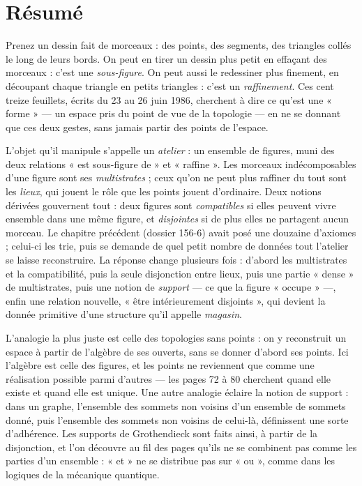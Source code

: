 \documentclass[11pt,a4paper]{article}
\begin{document}
\section*{Résumé}

\begin{resume}
Prenez un dessin fait de morceaux : des points, des segments, des triangles
collés le long de leurs bords. On peut en tirer un dessin plus petit en
effaçant des morceaux : c'est une \emph{sous-figure}. On peut aussi le
redessiner plus finement, en découpant chaque triangle en petits triangles :
c'est un \emph{raffinement}. Ces cent treize feuillets, écrits du 23 au 26 juin
1986, cherchent à dire ce qu'est une « forme » --- un espace pris du point de
vue de la topologie --- en ne se donnant que ces deux gestes, sans jamais
partir des points de l'espace.

L'objet qu'il manipule s'appelle un \emph{atelier} : un ensemble de figures,
muni des deux relations « est sous-figure de » et « raffine ». Les morceaux
indécomposables d'une figure sont ses \emph{multistrates} ; ceux qu'on ne peut
plus raffiner du tout sont les \emph{lieux}, qui jouent le rôle que les points
jouent d'ordinaire. Deux notions dérivées gouvernent tout : deux figures sont
\emph{compatibles} si elles peuvent vivre ensemble dans une même figure, et
\emph{disjointes} si de plus elles ne partagent aucun morceau. Le chapitre
précédent (dossier 156-6) avait posé une douzaine d'axiomes ; celui-ci les
trie, puis se demande de quel petit nombre de données tout l'atelier se laisse
reconstruire. La réponse change plusieurs fois : d'abord les multistrates et la
compatibilité, puis la seule disjonction entre lieux, puis une partie « dense »
de multistrates, puis une notion de \emph{support} --- ce que la figure
« occupe » ---, enfin une relation nouvelle, « être intérieurement disjoints »,
qui devient la donnée primitive d'une structure qu'il appelle \emph{magasin}.

L'analogie la plus juste est celle des topologies sans points : on y
reconstruit un espace à partir de l'algèbre de ses ouverts, sans se donner
d'abord ses points. Ici l'algèbre est celle des figures, et les points ne
reviennent que comme une réalisation possible parmi d'autres --- les pages 72
à 80 cherchent quand elle existe et quand elle est unique. Une autre analogie
éclaire la notion de support : dans un graphe, l'ensemble des sommets non
voisins d'un ensemble de sommets donné, puis l'ensemble des sommets non
voisins de celui-là, définissent une sorte d'adhérence. Les supports de
Grothendieck sont faits ainsi, à partir de la disjonction, et l'on découvre au
fil des pages qu'ils ne se combinent pas comme les parties d'un ensemble :
« et » ne se distribue pas sur « ou », comme dans les logiques de la mécanique
quantique.


\end{resume}
\end{document}
